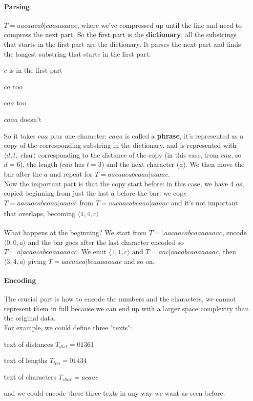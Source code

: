\documentclass[10pt]{report}
\begin{document}
\paragraph{Parsing} $T=aacaacab|caaaaaaac$, where we've compressed up until the line and need to compress the next part. So the first part is the \textbf{dictionary}, all the substrings that starts in the first part are the dictionary. It parses the next part and finds the longest substring that starts in the first part:
\begin{list}{}{}
	\item $c$ is in the first part
	\item $ca$ too
	\item $caa$ too
	\item $caaa$ doesn't
\end{list}
So it takes $caa$ plus one character: $caaa$ is called a \textbf{phrase}, it's represented as a copy of the corresponding substring in the dictionary, and is represented with $\langle d,l,$ char$\rangle$ corresponding to the distance of the copy (in this case, from $caa$, so $d=6$), the length ($caa$ has $l=3$) and the next character ($a$). We then move the bar after the $a$ and repeat for $T=aacaacabcaaa|aaaac$.\\
Now the important part is that the copy start before: in this case, we have 4 $a$s, copied beginning from just the last $a$ before the bar: we copy $T=aacaacabcaaa|\underline{aaaa}c$ from $T=aacaacabcaa\underline{a|aaa}ac$ and it's not important that overlaps, becoming $\langle 1,4,c\rangle$\\\\
What happens at the beginning? We start from $T=|aacaacabcaaaaaaac$, encode $\langle 0,0, a\rangle$ and the bar goes after the last character encoded so $T=a|acaacabcaaaaaaac$. We emit $\langle 1,1,c\rangle$ and $T=aac|aacabcaaaaaaac$, then $\langle 3, 4, a\rangle$ giving $T=aacaaca|bcaaaaaaac$ and so on.
\paragraph{Encoding} The crucial part is how to encode the numbers and the characters, we cannot represent them in full because we can end up with a larger space complexity than the original data.\\
For example, we could define three "texts": \begin{list}{}{}
	\item text of distances $T_{dist} = 01361$
	\item text of lengths $T_{len} = 01434$
	\item text of characters $T_{char} = acaac$
\end{list}
and we could encode these three texts in any way we want as seen before.
\end{document}
